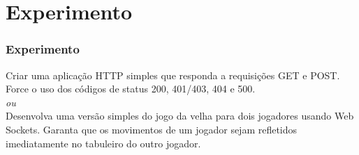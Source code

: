 \documentclass[
	10pt, %
	t, %
]{beamer}
\begin{document}
\section{Experimento}

\begin{frame}
	\frametitle{Experimento}

	Criar uma aplicação HTTP simples que responda a requisições GET e POST. Force o uso dos códigos de status 200, 401/403, 404 e 500.\\
	\bigskip \textit{ou}\\ \bigskip
	Desenvolva uma versão simples do jogo da velha para dois jogadores usando Web Sockets. Garanta que os movimentos de um jogador sejam refletidos imediatamente no tabuleiro do outro jogador.


\end{frame}

	


		
		
		

\end{document}
